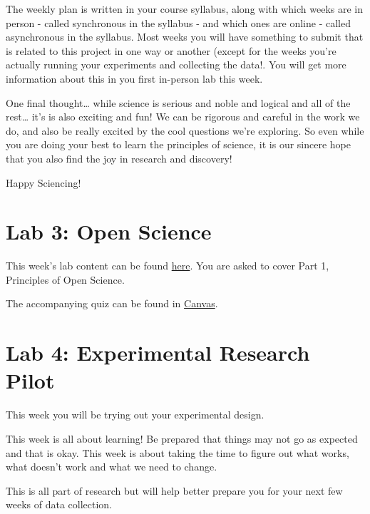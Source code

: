 \documentclass[
]{book}
\begin{document}
The weekly plan is written in your course syllabus, along with which weeks are in person - called synchronous in the syllabus - and which ones are online - called asynchronous in the syllabus. Most weeks you will have something to submit that is related to this project in one way or another (except for the weeks you're actually running your experiments and collecting the data!. You will get more information about this in you first in-person lab this week.

One final thought\ldots{} while science is serious and noble and logical and all of the rest\ldots{} it's is also exciting and fun! We can be rigorous and careful in the work we do, and also be really excited by the cool questions we're exploring. So even while you are doing your best to learn the principles of science, it is our sincere hope that you also find the joy in research and discovery!

Happy Sciencing!

\hypertarget{lab-3-open-science}{%
\chapter*{Lab 3: Open Science}\label{lab-3-open-science}}

This week's lab content can be found \href{https://ubco-biology.github.io/OS-Introduction/}{here}. You are asked to cover Part 1, Principles of Open Science.

The accompanying quiz can be found in \href{https://canvas.ubc.ca}{Canvas}.

\hypertarget{lab-4-experimental-research-pilot}{%
\chapter*{Lab 4: Experimental Research Pilot}\label{lab-4-experimental-research-pilot}}

This week you will be trying out your experimental design.

This week is all about learning! Be prepared that things may not go as expected and that is okay. This week is about taking the time to figure out what works, what doesn't work and what we need to change.

This is all part of research but will help better prepare you for your next few weeks of data collection.
\end{document}
